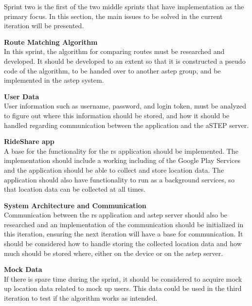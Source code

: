Sprint two is the first of the two middle sprints that have implementation as the primary focus. In this section, the main issues to be solved in the current iteration will be presented.

\textbf{Route Matching Algorithm}\\
In this sprint, the algorithm for comparing routes must be researched and developed. 
It should be developed to an extent so that it is constructed a pseudo code of the algorithm, to be handed over to another \gls{astep} group, and be implemented in the \gls{astep} system.

\textbf{User Data}\\
User information such as username, password, and login token, must be analyzed to figure out where this information should be stored, and how it should be handled regarding communication between the application and the aSTEP server. 

\textbf{RideShare app}\\
A base for the functionality for the \gls{rs} application should be implemented. 
The implementation should include a working including of the Google Play Services and the application should be able to collect and store location data. 
The application should also have functionality to run as a background services, so that location data can be collected at all times.

\textbf{System Architecture and Communication}\\
Communication between the \gls{rs} application and \gls{astep} server should also be researched and an implementation of the communication should be initialized in this iteration, ensuring the next iteration will have a base for communication. 
It should be considered how to handle storing the collected location data and how much should be stored where, either on the device or on the \gls{astep} server.

\textbf{Mock Data}\\
If there is spare time during the sprint, it should be considered to acquire mock up location data related to mock up users. 
This data could be used in the third iteration to test if the algorithm works as intended.